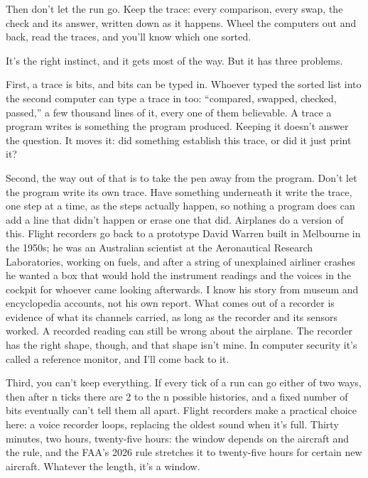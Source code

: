 \documentclass[11pt,twoside]{article}
\theoremstyle{thielethm}
\theoremstyle{thieledef}
\theoremstyle{thieledef}
\theoremstyle{thieledef}
\theoremstyle{thielethm}
\theoremstyle{thieleobs}
\theoremstyle{thielethm}
\begin{document}
Then don't let the run go. Keep the trace: every comparison, every swap, the check and its answer, written down as it happens. Wheel the computers out and back, read the traces, and you'll know which one sorted.

It's the right instinct, and it gets most of the way. But it has three problems.

First, a trace is bits, and bits can be typed in. Whoever typed the sorted list into the second computer can type a trace in too: ``compared, swapped, checked, passed,'' a few thousand lines of it, every one of them believable. A trace a program writes is something the program produced. Keeping it doesn't answer the question. It moves it: did something establish this trace, or did it just print it?

Second, the way out of that is to take the pen away from the program. Don't let the program write its own trace. Have something underneath it write the trace, one step at a time, as the steps actually happen, so nothing a program does can add a line that didn't happen or erase one that did. Airplanes do a version of this. Flight recorders go back to a prototype David Warren built in Melbourne in the 1950s; he was an Australian scientist at the Aeronautical Research Laboratories, working on fuels, and after a string of unexplained airliner crashes he wanted a box that would hold the instrument readings and the voices in the cockpit for whoever came looking afterwards. I know his story from museum and encyclopedia accounts, not his own report. What comes out of a recorder is evidence of what its channels carried, as long as the recorder and its sensors worked. A recorded reading can still be wrong about the airplane. The recorder has the right shape, though, and that shape isn't mine. In computer security it's called a reference monitor, and I'll come back to it.

Third, you can't keep everything. If every tick of a run can go either of two ways, then after n ticks there are 2 to the n possible histories, and a fixed number of bits eventually can't tell them all apart. Flight recorders make a practical choice here: a voice recorder loops, replacing the oldest sound when it's full. Thirty minutes, two hours, twenty-five hours: the window depends on the aircraft and the rule, and the FAA's 2026 rule stretches it to twenty-five hours for certain new aircraft. Whatever the length, it's a window.
\end{document}
